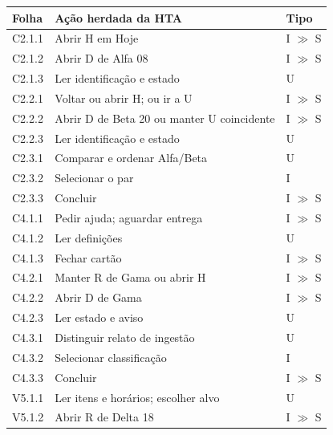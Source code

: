 
\noindent\begin{minipage}[t]{\columnwidth}
\footnotesize
\begin{tabularx}{\columnwidth}{@{}lYP{.15\columnwidth}@{}}\toprule
Folha & Ação herdada da HTA & Tipo\\\midrule
C2.1.1 & Abrir H em Hoje & I $\gg$ S\\
C2.1.2 & Abrir D de Alfa 08 & I $\gg$ S\\
C2.1.3 & Ler identificação e estado & U\\
C2.2.1 & Voltar ou abrir H; ou ir a U & I $\gg$ S\\
C2.2.2 & Abrir D de Beta 20 ou manter U coincidente & I $\gg$ S\\
C2.2.3 & Ler identificação e estado & U\\
C2.3.1 & Comparar e ordenar Alfa/Beta & U\\
C2.3.2 & Selecionar o par & I\\
C2.3.3 & Concluir & I $\gg$ S\\
C4.1.1 & Pedir ajuda; aguardar entrega & I $\gg$ S\\
C4.1.2 & Ler definições & U\\
C4.1.3 & Fechar cartão & I $\gg$ S\\
C4.2.1 & Manter R de Gama ou abrir H & I $\gg$ S\\
C4.2.2 & Abrir D de Gama & I $\gg$ S\\
C4.2.3 & Ler estado e aviso & U\\
C4.3.1 & Distinguir relato de ingestão & U\\
C4.3.2 & Selecionar classificação & I\\
C4.3.3 & Concluir & I $\gg$ S\\
V5.1.1 & Ler itens e horários; escolher alvo & U\\
V5.1.2 & Abrir R de Delta 18 & I $\gg$ S\\
\bottomrule\end{tabularx}
\end{minipage}
\newpage
